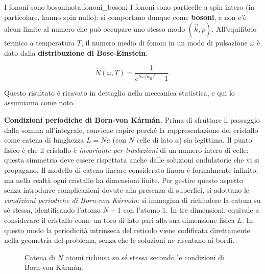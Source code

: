 \begin{note}{I fononi sono bosoni}{nota:fononi_bosoni}
I fononi sono particelle a spin intero (in particolare, hanno spin nullo): si comportano dunque come \textbf{bosoni}, e non c'è alcun limite al numero che può occupare uno stesso modo \( (\vec{k}, p) \). All'equilibrio termico a temperatura \( T \), il numero medio di fononi in un modo di pulsazione \( \omega \) è dato dalla \textbf{distribuzione di Bose-Einstein}:

\begin{equation}
    \bar{N}(\omega, T) = \frac{1}{e^{\hbar \omega / k_B T} - 1}.
\end{equation}

Questo risultato è ricavato in dettaglio nella meccanica statistica, e qui lo assumiamo come noto.
\end{note}

\textbf{Condizioni periodiche di Born-von Kármán.} Prima di sfruttare il passaggio dalla somma all'integrale, conviene capire perché la rappresentazione del cristallo come catena di lunghezza \( L = N a \) (con \( N \) celle di lato \( a \)) sia legittima. Il punto fisico è che il cristallo è \emph{invariante per traslazioni} di un numero intero di celle: questa simmetria deve essere rispettata anche dalle soluzioni ondulatorie che vi si propagano. Il modello di catena lineare considerato finora è formalmente infinito, ma nella realtà ogni cristallo ha dimensioni finite. Per gestire questo aspetto senza introdurre complicazioni dovute alla presenza di superfici, si adottano le \emph{condizioni periodiche di Born-von Kármán}: si immagina di richiudere la catena su sé stessa, identificando l'atomo \( N+1 \) con l'atomo \( 1 \). In tre dimensioni, equivale a considerare il cristallo come un toro di lato pari alla sua dimensione fisica \( L \). In questo modo la periodicità intrinseca del reticolo viene codificata direttamente nella geometria del problema, senza che le soluzioni ne risentano ai bordi.

\begin{figure}[htbp]
    \centering
    \caption{Catena di \( N \) atomi richiusa su sé stessa secondo le condizioni di Born-von Kármán.}
    \label{fig:born_von_karman}
\end{figure}


